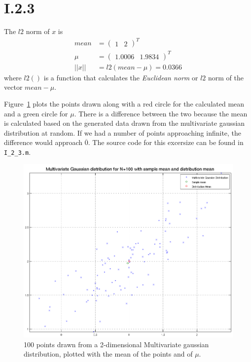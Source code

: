 \section*{I.2.3}
The $l2$ norm of $x$ is
\begin{align*}
	mean  &= \begin{pmatrix}1 & 2\end{pmatrix}^T \\
	\mu   &= \begin{pmatrix}1.0006 & 1.9834\end{pmatrix}^T \\
	||x|| &= l2(mean - \mu) = 0.0366
\end{align*}
where $l2()$ is a function that calculates the \textit{Euclidean norm} or $l2$
norm of the vector $mean - \mu$.

Figure~\ref{fig:I.2.3} plots the points drawn along with a red circle for the
calculated mean and a green circle for $\mu$. There is a difference between the
two because the mean is calculated based on the generated data drawn from the
multivariate gaussian distribution at random. If we had a number of points
approaching infinite, the difference would approach $\overline{0}$. The source
code for this excersize can be found in \texttt{I\_2\_3.m}.

\begin{figure}[h!]
	\includegraphics[width=\textwidth]{img/multigaussmeanxy}
	\caption{100 points drawn from a 2-dimensional Multivariate gaussian
          distribution, plotted with the mean of the points and of $\mu$.
        \label{fig:I.2.3}}
\end{figure}

